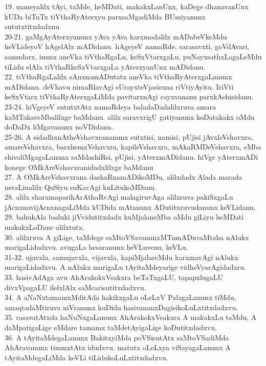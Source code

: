 \documentclass{article}
\begin{document}
19. maneyalilx tAyi, taMde, heMDati, makakxLanUnx, kaDege dhanavanUnx kUDa biTuTx tiVthaRyAterxyu parxsaMgadiMda BUmiyanunx sututxtitxdadxnu\\
20-21. gaMgAyAterxyanunx yAva yAva karxmadalilx mADabeVkeMdu heVLideyoV hAgelAlx mADidanu. hAgeyeV namaRde, sarasavxti, goVdAvari, samudarx, inunx aneVka tiVthaRgaLu, keSxVtarxgaLu, puNayxsathxLagaLeMdu tiLidu elAlx tiVthaRkeSxVtarxgaLa yAterxyanUnx mADidanu.\\
22. tiVthaRgaLalilx sAnxnamADutatx aneVka tiVthaRyAterxgaLanunx mADidanu. deVhavu nimaRlavAgi sUrayxteVjasisxna riVtiyAyitu. IriVti keSxVtarx tiVthaRyAterxgaLiMda pavitarxnAgi cayxvananu parxkAshisidanu.\\
23-24. hiVgeyeV sututxtAtx namaRdeya baladaDadalilxruva amara kaMTakaveMbalilxge baMdanu. alilx saravxrigU gatiyanunx koDatakakx oMdu doDaDx liMgavanunx noVDidanu.\\
25-26. A sidadhxnAtheVshavxrananunx sutxtisi, namisi, pUjisi jAvxleVshavxra, amareVshavxra, barxhemxVshavxra, kapileVshavxra, mAkaRMDeVshavxra, eMba shivaliMgagaLanunx saMdashiRsi, pUjisi, yAterxmADidanu. hiVge yAterxmADi konege OMkAreVshavxranidadxlilxge baMdanu\\
27. A OMkAreVshavxrana dashaRnamADikoMDu, alilxdadx Alada marada neraLinalilx QuSiyu suKavAgi kuLitukoMDanu.\\
28. alilx sharxmaparihArAthaRvAgi malagiruvAga alilxruva pakiSxgaLu jAcnxnavijAcnxnagaLiMda kUDida mAtanunx ADutitxruvudanunx keVLidanu.\\
29. bahukAla baduki jiVvidutitxdadx kuMjalaneMba oMdu giLiyu heMDati makakxLoDane alilxtutx.\\
30. alilxruva A giLige, taMdege saMtoVSavanunxMTumADuvaMtaha nAlukx marigaLidadxvu. avugaLa hesaranunx heVLuvenu, keVLu.\\
31-32. ujavxla, samujavxla, vijavxla, kapiMjalareMdu karxmavAgi nAlukx marigaLidadxvu. A nAlukx marigaLu tAyitaMdeyarige vidheVyarAgidadxru.\\
33. hasivAdAga avu AhArakokxVsakxra beTaTxgaLU, tapapxlugaLU divxVpagaLU ilelxlAlx saMcarisutitxdadxvu.\\
34. A aNaNxtamamxMdirAda hakikxgaLu oLeLxV PalagaLanunx tiMdu, amaqtadaMtiruva niVranunx kuDidu hasivananxDagisikoLuLxtitxdadxvu.\\
35. rasavatAtxda haNuNxgaLanunx AhArakokxVsakxra A makakxLu taMdu, A daMpatigaLige eMdare tamamx taMdetAyigaLige koDutitxdadxvu.\\
36. A tAyitaMdegaLanunx BakitxyiMda poVSisutAtx saMtoVSadiMda AhAravanunx tinunxtAtx idudxvu. matutx oLeLxya viSayagaLanunx A tAyitaMdegaLiMda keVLi tiLidukoLuLxtitxdadxvu.\\
\end{document}
